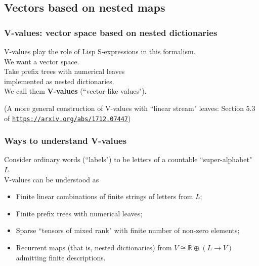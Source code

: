 \documentclass{beamer}
\newcommand{\msmagenta}[1]{{\color{mymagenta} #1}}
\begin{document}
\subsection{Vectors based on nested maps}


\begin{frame}

  \frametitle{\msmagenta{V-values: vector space based on nested dictionaries}}


V-values play the role of Lisp S-expressions in this formalism.\\[3ex]


We want a vector space.\\[3ex]

Take prefix trees with numerical leaves\\ implemented as nested dictionaries.\\[3ex]

We call them {\bf V-values}
(``vector-like values").\\[3ex]

\hrulefill

(A more general construction of V-values with ``linear stream" leaves:  Section 5.3 of \href{https://arxiv.org/abs/1712.07447}{\tt\footnotesize  https://arxiv.org/abs/1712.07447})

\end{frame}





\begin{frame}

  \frametitle{\msmagenta{Ways to understand V-values}}

Consider ordinary words (``labels") to be letters of a countable ``super-alphabet" $L$.\\[2ex]

V-values can be understood as

\begin{itemize}

  \item Finite linear combinations of finite strings of letters from $L$;
  \item Finite prefix trees with numerical leaves;
  \item Sparse ``tensors of mixed rank" with finite number of non-zero elements;
  \item Recurrent maps (that is, nested dictionaries) from $V \cong \mathbb{R}\oplus (L \rightarrow V)$  admitting finite descriptions.

\end{itemize}

\end{frame}
\end{document}
